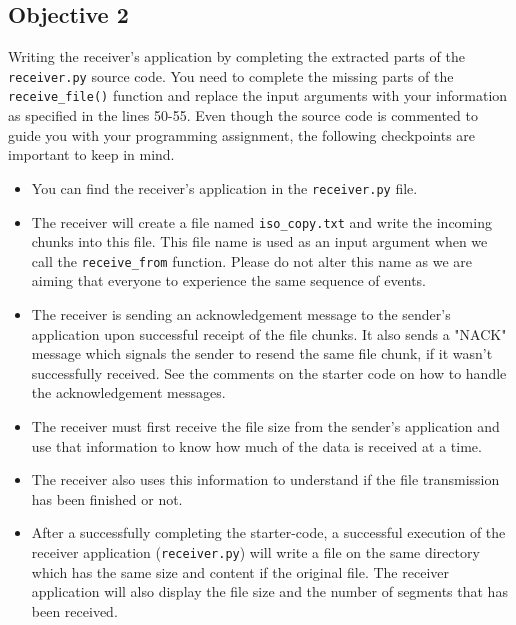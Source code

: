\documentclass[11pt]{article}
\begin{document}

\subsection{Objective 2}
\label{subsec:obj2}
Writing the receiver's application by completing the extracted parts of the \texttt{receiver.py} source code. You need to complete the missing parts of the \texttt{receive\_file()} function and replace the input arguments with your information as specified in the lines 50-55. Even though the source code is commented to guide you with your programming assignment, the following checkpoints are important to keep in mind.

\begin{itemize}
    \item You can find the receiver's application in the \texttt{receiver.py} file.
    \item The receiver will create a file named \texttt{iso\_copy.txt} and write the incoming chunks into this file. This file name is used as an input argument when we call the \texttt{receive\_from} function. Please do not alter this name as we are aiming that everyone to experience the same sequence of events.
    \item The receiver is sending an acknowledgement message to the sender's application upon successful receipt of the file chunks. It also sends a "NACK" message which signals the sender to resend the same file chunk, if it wasn't successfully received. See the comments on the starter code on how to handle the acknowledgement messages.
    \item The receiver must first receive the file size from the sender's application and use that information to know how much of the data is received at a time.
    \item The receiver also uses this information to understand if the file transmission has been finished or not.
    \item After a successfully completing the starter-code, a successful execution of the receiver application (\texttt{receiver.py}) will write a file on the same directory which has the same size and content if the original file. The receiver application will also display the file size and the number of segments that has been received.
\end{itemize}
\end{document}

